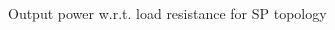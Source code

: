 
\begin{figure}[h]
\centering
\begin{subfigmatrix}{2} 
\end{subfigmatrix}
\end{figure}
\begin{figure}[H]
\centering
\begin{subfigmatrix}{1} 
\end{subfigmatrix}
\caption{Output power w.r.t. load resistance for SP topology}
\end{figure}


